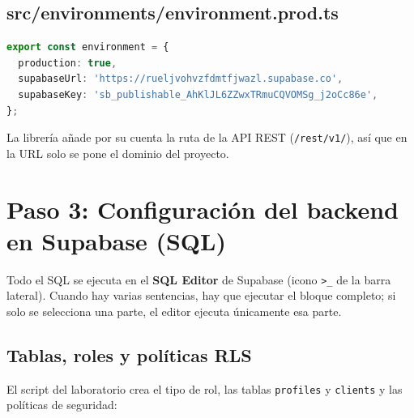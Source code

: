 \documentclass[a4paper, 12pt]{article}
\begin{document}
\subsection*{src/environments/environment.prod.ts}

\begin{lstlisting}[language=TypeScript, caption={Credenciales en modo producción}]
export const environment = {
  production: true,
  supabaseUrl: 'https://rueljvohvzfdmtfjwazl.supabase.co',
  supabaseKey: 'sb_publishable_AhKlJL6ZZwxTRmuCQVOMSg_j2oCc86e',
};
\end{lstlisting}

La librería añade por su cuenta la ruta de la API REST
(\texttt{/rest/v1/}), así que en la URL solo se pone el dominio del proyecto.

\section{Paso 3: Configuración del backend en Supabase (SQL)}

Todo el SQL se ejecuta en el \textbf{SQL Editor} de Supabase
(icono \texttt{>\_} de la barra lateral). Cuando hay varias sentencias, hay
que ejecutar el bloque completo; si solo se selecciona una parte, el editor
ejecuta únicamente esa parte.

\subsection{Tablas, roles y políticas RLS}

El script del laboratorio crea el tipo de rol, las tablas \texttt{profiles} y
\texttt{clients} y las políticas de seguridad:
\end{document}
